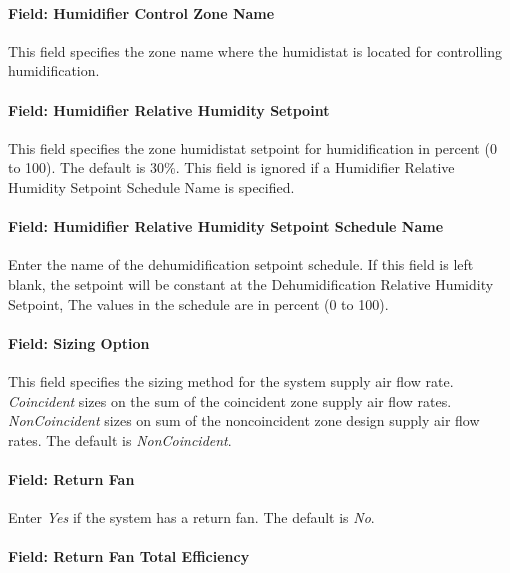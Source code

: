 \paragraph{Field: Humidifier Control Zone Name}\label{field-humidifier-control-zone-name-2}

This field specifies the zone name where the humidistat is located for controlling humidification.

\paragraph{Field: Humidifier Relative Humidity Setpoint}\label{field-humidifier-relative-humidity-setpoint}

This field specifies the zone humidistat setpoint for humidification in percent (0 to 100). The default is 30\%. This field is ignored if a Humidifier Relative Humidity Setpoint Schedule Name is specified.

\paragraph{Field: Humidifier Relative Humidity Setpoint Schedule Name}\label{field-humidifier-relative-humidity-setpoint-schedule-name}

Enter the name of the dehumidification setpoint schedule. If this field is left blank, the setpoint will be constant at the Dehumidification Relative Humidity Setpoint, The values in the schedule are in percent (0 to 100).

\paragraph{Field: Sizing Option}\label{field-sizing-option-000}

This field specifies the sizing method for the system supply air flow rate. \emph{Coincident} sizes on the sum of the coincident zone supply air flow rates. \emph{NonCoincident} sizes on sum of the noncoincident zone design supply air flow rates. The default is \emph{NonCoincident}.

\paragraph{Field: Return Fan}\label{field-return-fan}

Enter \emph{Yes} if the system has a return fan. The default is \emph{No}.

\paragraph{Field: Return Fan Total Efficiency}\label{field-return-fan-total-efficiency}

